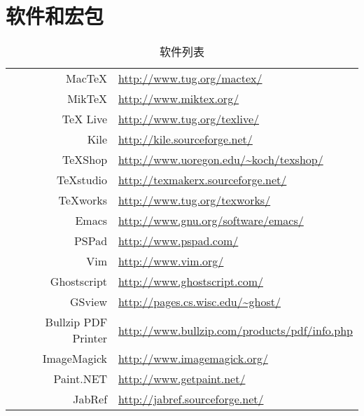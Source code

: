 \chapter{软件和宏包}

\begin{table}[!htbp]
\caption{软件列表}
\label{tab:softurl}
\centering
\begin{tabular}{rl}
    \toprule
        MacTeX      & \url{http://www.tug.org/mactex/} \\
        MikTeX      & \url{http://www.miktex.org/} \\
        TeX Live    & \url{http://www.tug.org/texlive/} \\
    \midrule
        Kile        & \url{http://kile.sourceforge.net/} \\
        TeXShop     & \url{http://www.uoregon.edu/~koch/texshop/} \\
        TeXstudio   & \url{http://texmakerx.sourceforge.net/} \\
        TeXworks    & \url{http://www.tug.org/texworks/} \\
    \midrule
        Emacs       & \url{http://www.gnu.org/software/emacs/} \\
        PSPad       & \url{http://www.pspad.com/} \\
        Vim         & \url{http://www.vim.org/} \\
    \midrule
        Ghostscript & \url{http://www.ghostscript.com/} \\
        GSview      & \url{http://pages.cs.wisc.edu/~ghost/} \\
        Bullzip PDF Printer & \url{http://www.bullzip.com/products/pdf/info.php} \\
    \midrule
        ImageMagick & \url{http://www.imagemagick.org/} \\
        Paint.NET   & \url{http://www.getpaint.net/} \\
    \midrule
        JabRef      & \url{http://jabref.sourceforge.net/} \\
    \bottomrule
\end{tabular}
\end{table}
